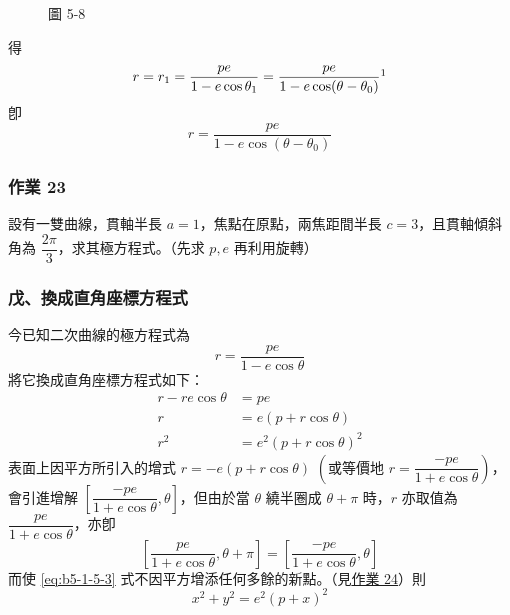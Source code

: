 \begin{figure}[H]
\caption*{圖 5-8}
\label{fig:b5-5-8}
\end{figure}

得
\[
  r = r_1 = \frac{pe}{1 - e\cos\theta_1} = \frac{pe}{1 - e\cos(\theta - \theta_0)}\footnotemark
\]
\label{note:b5-ch1-p51-eq}
卽
\[
  r = \frac{pe}{1 - e\cos(\theta - \theta_0)}
\]

\subsubsection*{作業 23}
設有一雙曲線，貫軸半長 $a = 1$，焦點在原點，兩焦距間半長 $c = 3$，且貫軸傾斜角為 $\dfrac{2\pi}{3}$，求其極方程式。（先求 $p, e$ 再利用旋轉）

\subsubsection*{戊、換成直角座標方程式}

今已知二次曲線的極方程式為
\begin{equation}
  r = \frac{pe}{1 - e\cos\theta} \tag{2} \label{eq:b5-1-5-2}
\end{equation}
將它換成直角座標方程式如下：
\begin{align}
  r - re\cos\theta &= pe \nonumber \\
  r &= e(p + r\cos\theta) \nonumber \\
  r^2 &= e^2(p + r\cos\theta)^2 \tag{3} \label{eq:b5-1-5-3}
\end{align}
表面上因平方所引入的增式 $r = -e(p + r\cos\theta)$ $\left(\text{或等價地 } r = \dfrac{-pe}{1 + e\cos\theta}\right)$，會引進增解 $\left[\dfrac{-pe}{1 + e\cos\theta}, \theta\right]$，但由於當 $\theta$ 繞半圈成 $\theta + \pi$ 時，$r$ 亦取值為 $\dfrac{pe}{1 + e\cos\theta}$，亦卽
\[
  \left[\frac{pe}{1 + e\cos\theta}, \theta + \pi\right] = \left[\frac{-pe}{1 + e\cos\theta}, \theta\right]
\]
而使 \eqref{eq:b5-1-5-3} 式不因平方增添任何多餘的新點。（見\underline{作業 24}）則
\[
  x^2 + y^2 = e^2(p + x)^2
\]

